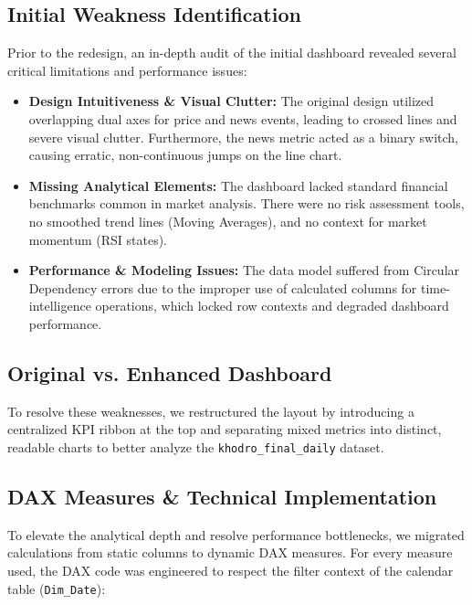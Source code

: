 \documentclass[a4paper,12pt]{extarticle}
\begin{document}
\subsection{Initial Weakness Identification}
Prior to the redesign, an in-depth audit of the initial dashboard revealed several critical limitations and performance issues:
\begin{itemize}
    \item \textbf{Design Intuitiveness \& Visual Clutter:} The original design utilized overlapping dual axes for price and news events, leading to crossed lines and severe visual clutter. Furthermore, the news metric acted as a binary switch, causing erratic, non-continuous jumps on the line chart.
    \item \textbf{Missing Analytical Elements:} The dashboard lacked standard financial benchmarks common in market analysis. There were no risk assessment tools, no smoothed trend lines (Moving Averages), and no context for market momentum (RSI states).
    \item \textbf{Performance \& Modeling Issues:} The data model suffered from Circular Dependency errors due to the improper use of calculated columns for time-intelligence operations, which locked row contexts and degraded dashboard performance.
\end{itemize}

\subsection{Original vs. Enhanced Dashboard}
To resolve these weaknesses, we restructured the layout by introducing a centralized KPI ribbon at the top and separating mixed metrics into distinct, readable charts to better analyze the \texttt{khodro\_final\_daily} dataset.


\subsection{DAX Measures \& Technical Implementation}
To elevate the analytical depth and resolve performance bottlenecks, we migrated calculations from static columns to dynamic DAX measures. For every measure used, the DAX code was engineered to respect the filter context of the calendar table (\texttt{Dim\_Date}):
\end{document}
